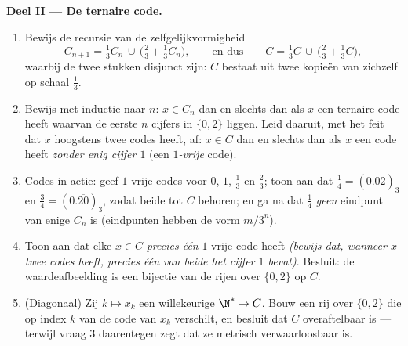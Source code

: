 \begin{problem}[{Weekendopgave --- de \omterm{pb:b1:topology:1}{Cantorverzameling} van de middelste
derden: lengte nul, overaftelbaar, perfect, en $C + C = \intcc{0}{2}$}]
\medskip
\noindent\textbf{Deel II --- De ternaire code.}
\begin{enumerate}[resume]
  \item Bewijs de recursie van de zelfgelijkvormigheid
        \[
        C_{n+1} = \tfrac13 C_n \,\cup\,
        \bigl(\tfrac23 + \tfrac13 C_n\bigr),
        \qquad\text{en dus}\qquad
        C = \tfrac13 C \,\cup\, \bigl(\tfrac23 + \tfrac13
        C\bigr),
        \]
        waarbij de twee stukken disjunct zijn: $C$ bestaat uit twee
        kopieën van zichzelf op schaal $\frac13$.
  \item Bewijs met inductie naar $n$: $x \in C_n$ dan en slechts dan als
        $x$ een ternaire code heeft waarvan de eerste $n$ cijfers in
        $\{0, 2\}$ liggen. Leid daaruit, met het feit dat $x$ hoogstens
        twee codes heeft, af: $x \in C$ dan en slechts dan als $x$ een
        code heeft \emph{zonder enig cijfer $1$} (een \emph{$1$-vrije}
        code).
  \item Codes in actie: geef $1$-vrije codes voor $0$, $1$, $\frac13$ en
        $\frac23$; toon aan dat $\frac14 = (0.\overline{02})_3$ en
        $\frac34 = (0.\overline{20})_3$, zodat beide tot $C$ behoren; en
        ga na dat $\frac14$ \emph{geen} eindpunt van enige $C_n$ is
        (eindpunten hebben de vorm $m/3^n$).
  \item Toon aan dat elke $x \in C$ \emph{precies één} $1$-vrije code
        heeft \emph{(bewijs dat, wanneer $x$ twee codes heeft, precies
        één van beide het cijfer $1$ bevat)}. Besluit: de
        waardeafbeelding is een bijectie van de rijen over $\{0,2\}$ op
        $C$.
  \item (Diagonaal) Zij $k \mapsto x_k$ een willekeurige  $\N^*
        \to C$. Bouw een rij over $\{0, 2\}$ die op index $k$ van de
        code van $x_k$ verschilt, en besluit dat $C$ overaftelbaar is
        --- terwijl vraag 3 daarentegen zegt dat ze metrisch
        verwaarloosbaar is.
\end{enumerate}


\end{problem}

